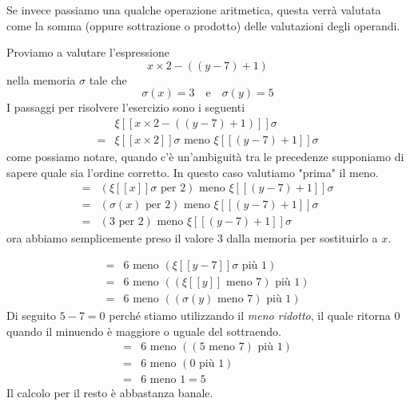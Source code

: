 Se invece passiamo una qualche operazione aritmetica, questa
verrà valutata come la somma (oppure sottrazione o prodotto)
delle valutazioni degli operandi.

\begin{example}
	Proviamo a valutare l'espressione
	\[ x \times 2 - ((y - 7) + 1) \]
	nella memoria $\sigma$ tale che
	\[ \sigma (x) = 3 \quad \text{e} \quad \sigma(y) = 5 \]
	I passaggi per risolvere l'esercizio sono i seguenti
	\begin{align*}
		  & \xi [[ x \times 2 - ((y - 7) + 1) ]] \sigma \\
		= & \xi [[ x \times 2 ]] \sigma \text{ meno }
		\xi [[ (y - 7) + 1 ]] \sigma
	\end{align*}
	come possiamo notare, quando c'è un'ambiguità tra le
	precedenze supponiamo di sapere quale sia l'ordine
	corretto. In questo caso valutiamo "prima" il meno.
	\begin{align*}
		= & (\xi [[ x ]] \sigma \text{ per } 2) \text{ meno }
		\xi [[ (y - 7) + 1 ]] \sigma                          \\
		= & (\sigma(x) \text{ per } 2) \text{ meno }
		\xi [[ (y - 7) + 1 ]] \sigma                          \\
		= & (3 \text{ per } 2) \text{ meno }
		\xi [[ (y - 7) + 1 ]] \sigma
	\end{align*}
	ora abbiamo semplicemente preso il valore $3$ dalla memoria
	per sostituirlo a $x$.

	\begin{align*}
		= & 6 \text{ meno } (\xi [[y - 7]] \sigma
		\text{ più } 1)                                  \\
		= & 6 \text{ meno } ((\xi [[y]] \text{ meno } 7)
		\text{ più } 1)                                  \\
		= & 6 \text{ meno } ((\sigma(y) \text{ meno } 7)
		\text{ più } 1)
	\end{align*}
	Di seguito $5 - 7 = 0$ perché stiamo utilizzando il
	\emph{meno ridotto}, il quale ritorna $0$ quando il
	minuendo è maggiore o uguale del sottraendo.
	\begin{align*}
		= & 6 \text{ meno } ((5 \text{ meno } 7)
		\text{ più } 1)                          \\
		= & 6 \text{ meno } (0 \text{ più } 1)   \\
		= & 6 \text{ meno } 1 = 5
	\end{align*}
	Il calcolo per il resto è abbastanza banale.
\end{example}

